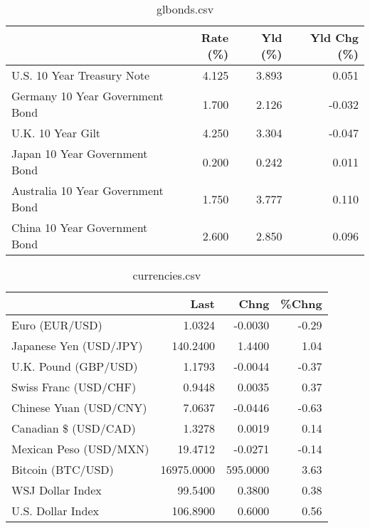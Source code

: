 \documentclass{article}%
\begin{document}
%


\begin{table}[htbp]%
\caption{glbonds.csv}%
\centering%
\begin{adjustbox}{width=1\textwidth}%
\begin{tabular}{lrrr}
\toprule
                                  &  Rate (\%) &  Yld (\%) &  Yld Chg (\%) \\
\midrule
       U.S. 10 Year Treasury Note &     4.125 &    3.893 &        0.051 \\
  Germany 10 Year Government Bond &     1.700 &    2.126 &       -0.032 \\
                U.K. 10 Year Gilt &     4.250 &    3.304 &       -0.047 \\
    Japan 10 Year Government Bond &     0.200 &    0.242 &        0.011 \\
Australia 10 Year Government Bond &     1.750 &    3.777 &        0.110 \\
    China 10 Year Government Bond &     2.600 &    2.850 &        0.096 \\
\bottomrule
\end{tabular}
%
\end{adjustbox}%
\end{table}

%


\begin{table}[htbp]%
\caption{currencies.csv}%
\centering%
\begin{adjustbox}{width=1\textwidth}%
\begin{tabular}{lrrr}
\toprule
                       &       Last &     Chng &  \%Chng \\
\midrule
        Euro (EUR/USD) &     1.0324 &  -0.0030 &  -0.29 \\
Japanese Yen (USD/JPY) &   140.2400 &   1.4400 &   1.04 \\
  U.K. Pound (GBP/USD) &     1.1793 &  -0.0044 &  -0.37 \\
 Swiss Franc (USD/CHF) &     0.9448 &   0.0035 &   0.37 \\
Chinese Yuan (USD/CNY) &     7.0637 &  -0.0446 &  -0.63 \\
  Canadian \$ (USD/CAD) &     1.3278 &   0.0019 &   0.14 \\
Mexican Peso (USD/MXN) &    19.4712 &  -0.0271 &  -0.14 \\
     Bitcoin (BTC/USD) & 16975.0000 & 595.0000 &   3.63 \\
      WSJ Dollar Index &    99.5400 &   0.3800 &   0.38 \\
     U.S. Dollar Index &   106.8900 &   0.6000 &   0.56 \\
\bottomrule
\end{tabular}
%
\end{adjustbox}%
\end{table}

%
\end{document}
